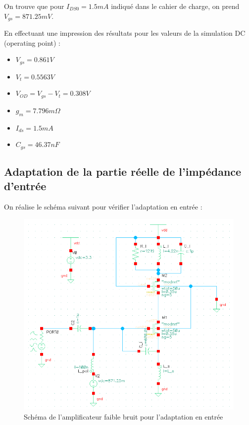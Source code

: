 \documentclass[a4paper]{article}
\begin{document}
On trouve que pour $I_{DS0} = 1.5 mA$ indiqu\'e dans le cahier de charge, on prend
$V_{gs} = 871.25 mV$.

En effectuant une impression des r\'esultats pour les valeurs de la simulation DC (operating point) :
\begin{itemize} \itemsep -3pt
  \item $V_{gs} = 0.861 V$
  \item $V_t = 0.5563 V$
  \item $V_{OD} = V_{gs} - V_{t} = 0.308V$
  \item $g_m = 7.796 m\Omega$
  \item $I_{ds} = 1.5 mA$
  \item $C_{gs} = 46.37 nF$
\end{itemize}

\clearpage

\subsection{Adaptation de la partie r\'eelle de l'imp\'edance d'entr\'ee}

On r\'ealise le sch\'ema suivant pour v\'erifier l'adaptation en entr\'ee :

\begin{figure}[!htb]
\begin{center}
  \includegraphics[scale=0.35]{Q2-schematic-adaptation.png}
  \caption{Sch\'ema de l'amplificateur faible bruit pour l'adaptation en entr\'ee}
  \label{lna-adaptation}
\end{center}
\end{figure}
\end{document}

